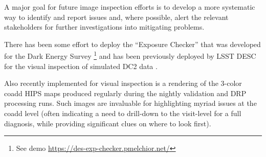 A major goal for future image inspection efforts is to develop a more systematic
way to identify and report issues and, where possible, alert the
relevant stakeholders for further investigations into mitigating problems.

There has been some effort to deploy the ``Exposure Checker'' that was developed for the Dark Energy Survey \citep{2016A&C....16...99M}\footnote{See demo \url{https://des-exp-checker.pmelchior.net/}} and has been previously deployed by LSST DESC for the visual inspection of simulated DC2 data \citep{2021ApJS..253...31L}.

Also recently implemented for visual inspection is a rendering of the 3-color coadd
HIPS maps produced regularly during the nightly validation and DRP processing runs.
Such images are invaluable for highlighting myriad issues at the coadd level (often
indicating a need to drill-down to the visit-level for a full diagnosis, while
providing significant clues on where to look first).
